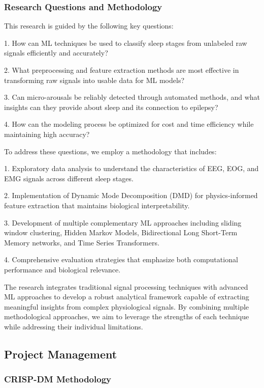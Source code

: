\documentclass[a4paper,12pt,twoside]{article}
\begin{document}
\subsubsection{Research Questions and Methodology}

This research is guided by the following key questions:

1. How can ML techniques be used to classify sleep stages from unlabeled raw signals efficiently and accurately?

2. What preprocessing and feature extraction methods are most effective in transforming raw signals into usable data for ML models?

3. Can micro-arousals be reliably detected through automated methods, and what insights can they provide about sleep and its connection to epilepsy?

4. How can the modeling process be optimized for cost and time efficiency while maintaining high accuracy?

To address these questions, we employ a methodology that includes:

1. Exploratory data analysis to understand the characteristics of EEG, EOG, and EMG signals across different sleep stages.

2. Implementation of Dynamic Mode Decomposition (DMD) for physics-informed feature extraction that maintains biological interpretability.

3. Development of multiple complementary ML approaches including sliding window clustering, Hidden Markov Models, Bidirectional Long Short-Term Memory networks, and Time Series Transformers.

4. Comprehensive evaluation strategies that emphasize both computational performance and biological relevance.

The research integrates traditional signal processing techniques with advanced ML approaches to develop a robust analytical framework capable of extracting meaningful insights from complex physiological signals. By combining multiple methodological approaches, we aim to leverage the strengths of each technique while addressing their individual limitations.

\subsection{Project Management}




\subsubsection{CRISP-DM Methodology}
\end{document}
